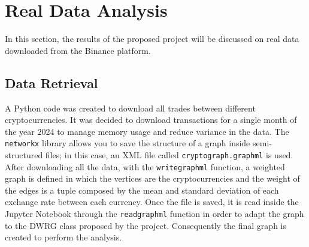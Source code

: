 \section{Real Data Analysis}\label{experiments}
In this section, the results of the proposed project will be discussed on real data downloaded from the Binance platform.
\subsection{Data Retrieval}
A Python code was created to download all trades between different cryptocurrencies. It was decided to download transactions for a single month of the year 2024 to manage memory usage and reduce variance in the data.
The \texttt{networkx} library allows you to save the structure of a graph inside semi-structured files; in this case, an XML file called \texttt{crypto\textunderscore graph.graphml} is used. 
After downloading all the data, with the \texttt{write\textunderscore graphml} function, a weighted graph is defined in which the vertices are the cryptocurrencies and the weight of the edges is a tuple composed by the mean and standard deviation of each exchange rate between each currency.
Once the file is saved, it is read inside the Jupyter Notebook through the \texttt{read\textunderscore graphml} function in order to adapt the graph to the DWRG class proposed by the project. Consequently the final graph is created to perform the analysis.
